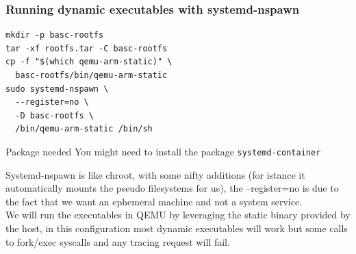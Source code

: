 \begin{frame}[fragile]
  \frametitle{Running dynamic executables with systemd-nspawn}
  \begin{verbatim}
mkdir -p basc-rootfs
tar -xf rootfs.tar -C basc-rootfs
cp -f "$(which qemu-arm-static)" \
  basc-rootfs/bin/qemu-arm-static
sudo systemd-nspawn \
  --register=no \
  -D basc-rootfs \
  /bin/qemu-arm-static /bin/sh
  \end{verbatim}
  \begin{alertblock}{Package needed}
  You might need to install the package \texttt{systemd-container}
  \end{alertblock}
\end{frame}
\only<handout> {
  Systemd-nspawn is like chroot, with some nifty additions (for istance it automatically mounts the pseudo filesystems for us),
   the --register=no is due to the fact that we want an ephemeral machine and not a system service. \\
  We will run the executables in QEMU by leveraging the static binary provided by the host, in this configuration
  most dynamic executables will work but some calls to fork/exec syscalls and any tracing request will fail.
}


